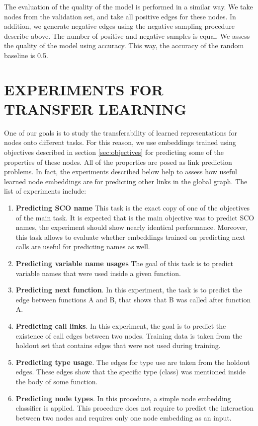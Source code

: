 \documentclass[a4paper,twoside]{article}
\begin{document}
The evaluation of the quality of the model is performed in a similar way. We take nodes from the validation set, and take all positive edges for these nodes. In addition, we generate negative edges using the negative sampling procedure describe above. The number of positive and negative samples is equal. We assess the quality of the model using accuracy. This way, the accuracy of the random baseline is 0.5.

\section{\uppercase{Experiments for Transfer Learning}}\label{sec:experiments}

One of our goals is to study the transferability of learned representations for nodes onto different tasks. For this reason, we use embeddings trained using objectives described in section \ref{sec:objectives} for predicting some of the properties of these nodes. All of the properties are posed as link prediction problems. In fact, the experiments described below help to assess how useful learned node embeddings are for predicting other links in the global graph. The list of experiments include:
\begin{enumerate}
    \item \textbf{Predicting SCO name} 
    This task is the exact copy of one of the objectives of the main task. It is expected that is the main objective was to predict SCO names, the experiment should show nearly identical performance. Moreover, this task allows to evaluate whether embeddings trained on predicting next calls are useful for predicting names as well. 
    \item \textbf{Predicting variable name usages}
    The goal of this task is to predict variable names that were used inside a given function.
    \item \textbf{Predicting next function}.
    In this experiment, the task is to predict the edge between functions A and B, that shows that B was called after function A. 
    \item \textbf{Predicting call links}. 
    In this experiment, the goal is to predict the existence of call edges between two nodes. Training data is taken from the holdout set that contains edges that were not used during training. 
    \item \textbf{Predicting type usage}.
    The edges for type use are taken from the holdout edges. These edges show that the specific type (class) was mentioned inside the body of some function. 
    \item \textbf{Predicting node types}.
    In this procedure, a simple node embedding classifier is applied. This procedure does not require to predict the interaction between two nodes and requires only one node embedding as an input. 
\end{enumerate}
\end{document}
